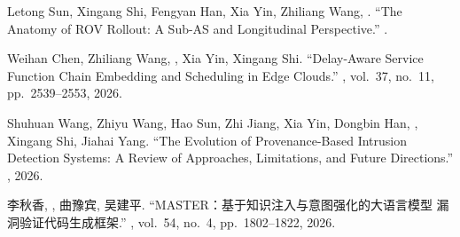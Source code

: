 \documentclass[11pt]{article}
\begin{document}
\begin{publist}
\item Letong Sun, Xingang Shi, Fengyan Han, Xia Yin, Zhiliang Wang, .
``The Anatomy of ROV Rollout: A Sub-AS and Longitudinal Perspective.''
. 
\item Weihan Chen, Zhiliang Wang, , Xia Yin, Xingang Shi.
``Delay-Aware Service Function Chain Embedding and Scheduling in Edge Clouds.''
, vol.~37, no.~11,
pp.~2539--2553, 2026.
\item Shuhuan Wang, Zhiyu Wang, Hao Sun, Zhi Jiang, Xia Yin, Dongbin Han, , Xingang Shi, Jiahai Yang. ``The Evolution of Provenance-Based Intrusion
Detection Systems: A Review of Approaches, Limitations, and Future Directions.''
, 2026.
\item 李秋香, \corr, 曲豫宾, 吴建平. ``MASTER：基于知识注入与意图强化的大语言模型
漏洞验证代码生成框架.'' , vol.~54, no.~4, pp.~1802--1822, 2026.
\end{publist}
\end{document}
